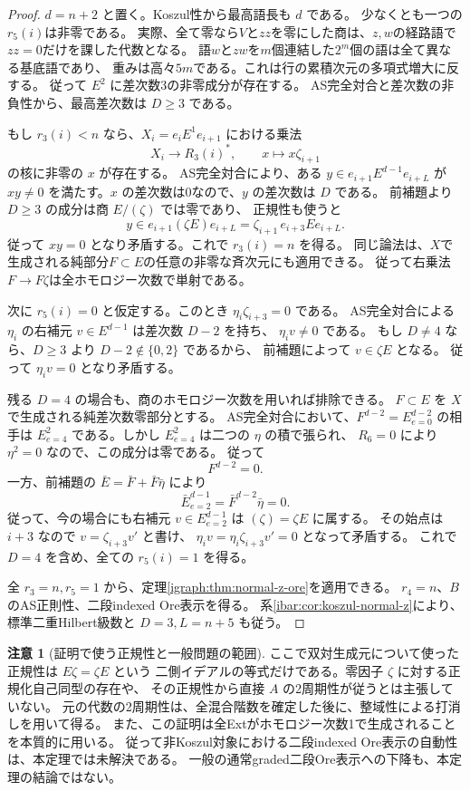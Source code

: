 \documentclass[11pt,a4paper]{ltjsarticle}
\theoremstyle{definition}
\newtheorem{remark}[theorem]{注意}
\begin{document}
\begin{proof}
$d=n+2$ と置く。Koszul性から最高語長も $d$ である。
少なくとも一つの$r_5(i)$は非零である。
実際、全て零なら$V$と$zz$を零にした商は、$z,w$の経路語で$zz=0$だけを課した代数となる。
語$w$と$zw$を$m$個連結した$2^m$個の語は全て異なる基底語であり、
重みは高々$5m$である。これは行の累積次元の多項式増大に反する。
従って $E^2$ に差次数3の非零成分が存在する。
AS完全対合と差次数の非負性から、最高差次数は $D\ge3$ である。

もし $r_3(i)<n$ なら、$X_i=e_iE^1e_{i+1}$ における乗法
\[
 X_i\longrightarrow R_3(i)^*,\qquad x\longmapsto x\zeta_{i+1}
\]
の核に非零の $x$ が存在する。
AS完全対合により、ある $y\in e_{i+1}E^{d-1}e_{i+L}$ が
$xy\ne0$ を満たす。$x$ の差次数は0なので、$y$ の差次数は $D$ である。
前補題より $D\ge3$ の成分は商 $E/(\zeta)$ では零であり、
正規性も使うと
\[
 y\in e_{i+1}(\zeta E)e_{i+L}
   =\zeta_{i+1}\,e_{i+3}Ee_{i+L}.
\]
従って $xy=0$ となり矛盾する。これで $r_3(i)=n$ を得る。
同じ論法は、$X$で生成される純部分$F\subset E$の任意の非零な斉次元にも適用できる。
従って右乗法$F\to F\zeta$は全ホモロジー次数で単射である。

次に $r_5(i)=0$ と仮定する。このとき
$\eta_i\zeta_{i+3}=0$ である。
AS完全対合による $\eta_i$ の右補元 $v\in E^{d-1}$ は差次数 $D-2$ を持ち、
$\eta_i v\ne0$ である。
もし $D\ne4$ なら、$D\ge3$ より $D-2\notin\{0,2\}$ であるから、
前補題によって $v\in\zeta E$ となる。
従って $\eta_iv=0$ となり矛盾する。

残る $D=4$ の場合も、商のホモロジー次数を用いれば排除できる。
$F\subset E$ を $X$ で生成される純差次数零部分とする。
AS完全対合において、$F^{d-2}=E^{d-2}_{e=0}$ の相手は
$E^2_{e=4}$ である。しかし $E^2_{e=4}$ は二つの $\eta$ の積で張られ、
$R_6=0$ により $\eta^2=0$ なので、この成分は零である。
従って
\[
 F^{d-2}=0.
\]
一方、前補題の $\bar E=\bar F+\bar F\bar\eta$ により
\[
 \bar E^{d-1}_{e=2}=\bar F^{d-2}\bar\eta=0.
\]
従って、今の場合にも右補元 $v\in E^{d-1}_{e=2}$ は $(\zeta)=\zeta E$ に属する。
その始点は $i+3$ なので $v=\zeta_{i+3}v'$ と書け、
$\eta_i v=\eta_i\zeta_{i+3}v'=0$ となって矛盾する。
これで $D=4$ を含め、全ての $r_5(i)=1$ を得る。

全 $r_3=n,r_5=1$ から、定理\ref{igraph:thm:normal-z-ore}を適用できる。
$r_4=n$、$B$ のAS正則性、二段indexed Ore表示を得る。
系\ref{ibar:cor:koszul-normal-z}により、
標準二重Hilbert級数と $D=3,L=n+5$ も従う。
\end{proof}

\begin{remark}[証明で使う正規性と一般問題の範囲]
ここで双対生成元について使った正規性は $E\zeta=\zeta E$ という
二側イデアルの等式だけである。零因子 $\zeta$ に対する正規化自己同型の存在や、
その正規性から直接 $A$ の2周期性が従うとは主張していない。
元の代数の2周期性は、全混合階数を確定した後に、整域性による打消しを用いて得る。
また、この証明は全Extがホモロジー次数1で生成されることを本質的に用いる。
従って非Koszul対象における二段indexed Ore表示の自動性は、本定理では未解決である。
一般の通常graded二段Ore表示への下降も、本定理の結論ではない。
\end{remark}
\end{document}
